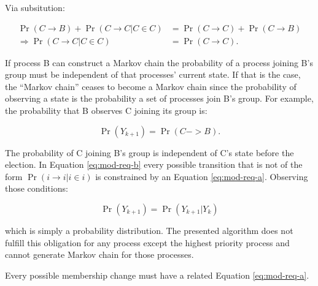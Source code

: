 Via subsitution:

\begin{equation}
\begin{split}
\Pr(C \rightarrow B) + \Pr(C \rightarrow C | C \in C) &= \Pr(C \rightarrow C) + \Pr(C \rightarrow B) \\
\Rightarrow \Pr(C \rightarrow C | C \in C) &= \Pr(C \rightarrow C).
\end{split}
\end{equation}

If process B can construct a Markov chain the probability of a process joining B's group must be independent of that processes' current state.
If that is the case, the ``Markov chain'' ceases to become a Markov chain since the probability of observing a state is the probability a set of processes join B's group.
For example, the probability that B observes C joining its group is:

\begin{equation}
\Pr(Y_{k+1}) = \Pr(C->B).
\end{equation}

The probability of C joining B's group is independent of C's state before the election.
In Equation \ref{eq:mod-req-b} every possible transition that is not of the form $\Pr(i \rightarrow i | i \in i)$ is constrained by an Equation \ref{eq:mod-req-a}.
Observing those conditions:

\begin{equation}
\Pr(Y_{k+1}) = \Pr(Y_{k+1} | Y_k)
\end{equation}

which is simply a probability distribution.
The presented algorithm does not fulfill this obligation for any process except the highest priority process and cannot generate Markov chain for those processes.

Every possible membership change must have a related Equation \ref{eq:mod-req-a}.